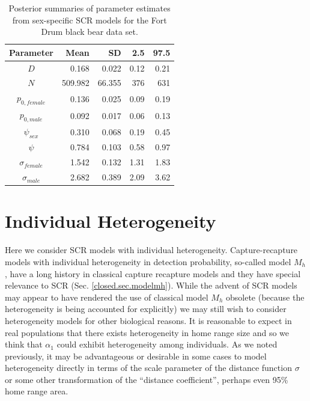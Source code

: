 \begin{table}[ht]
\centering
\caption{Posterior summaries of parameter estimates from sex-specific SCR models for the Fort Drum black bear data set.}
\begin{tabular}{crrrr}
\hline \hline
Parameter & Mean & SD & 2.5 & 97.5 \\
\hline
$D$  &     0.168 & 0.022 & 0.12 & 0.21  \\
$N$   &   509.982 & 66.355 & 376 & 631 \\
$p_{0, female}$ & 0.136 & 0.025 & 0.09 & 0.19 \\
$p_{0, male}$ & 0.092 & 0.017 & 0.06 & 0.13 \\
$\psi_{sex}$ &  0.310 & 0.068 & 0.19 & 0.45 \\
$\psi$  & 0.784 & 0.103 & 0.58 & 0.97 \\
$\sigma_{female}$ & 1.542 &  0.132 & 1.31 & 1.83 \\
$\sigma_{male}$ & 2.682 & 0.389 & 2.09 & 3.62 \\ \hline
\end{tabular}
\label{covariates.tab.SCRsex}
\end{table}



\section{Individual Heterogeneity}

Here we consider SCR models with individual heterogeneity.
Capture-recapture models with individual
heterogeneity in detection probability, so-called model $M_{h}$, have
a long history in classical capture recapture models and they have
special relevance to SCR (Sec. \ref{closed.sec.modelmh}). 
While the advent of SCR models may appear to have rendered the use of
classical model $M_h$ obsolete (because the heterogeneity is being
accounted for explicitly) we may still wish to consider
heterogeneity models for other biological reasons.
It is reasonable
to expect in real populations that there exists
heterogeneity in home range size and so we think that $\alpha_{1}$
could exhibit heterogeneity among individuals.  As we noted
previously, it may be advantageous or desirable in some cases to model
heterogeneity directly in terms of the scale parameter of the distance
function $\sigma$ or
some other transformation of the ``distance coefficient'', perhaps
even 95\% home range area.

